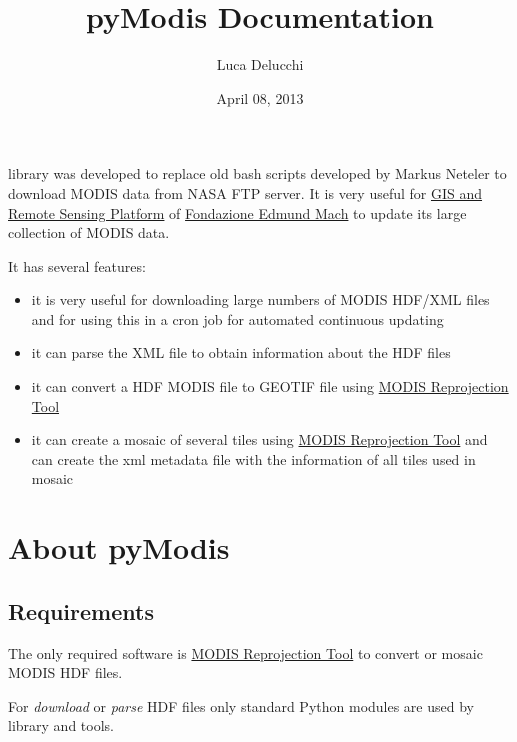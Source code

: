 \documentclass[a4paper,11pt,oneside]{sphinxmanual}
\title{pyModis Documentation}
\date{April 08, 2013}
\author{Luca Delucchi}
\begin{document}
\maketitle
\tableofcontents
{}\label{index::doc}


 library was developed to replace old bash scripts developed by Markus
Neteler to download MODIS data from NASA FTP server. It is very useful for
\href{http://gis.cri.fmach.it}{GIS and Remote Sensing Platform} of \href{http://www.fmach.it}{Fondazione Edmund Mach} to update
its large collection of MODIS data.

It has several features:
\begin{itemize}
\item {} 
it is very useful for downloading large numbers of MODIS HDF/XML files
and for using this in a cron job for automated continuous updating

\item {} 
it can parse the XML file to obtain information about the HDF files

\item {} 
it can convert a HDF MODIS file to GEOTIF file using \href{https://lpdaac.usgs.gov/lpdaac/tools/modis\_reprojection\_tool}{MODIS Reprojection Tool}

\item {} 
it can create a mosaic of several tiles using \href{https://lpdaac.usgs.gov/lpdaac/tools/modis\_reprojection\_tool}{MODIS Reprojection Tool} and can
create the xml metadata file with the information of all tiles used in mosaic

\end{itemize}


\chapter{About pyModis}
\label{info:welcome-to-pymodis}\label{info::doc}\label{info:about-pymodis}

\section{Requirements}
\label{info:requirements}
The only required software is \href{https://lpdaac.usgs.gov/tools/modis\_reprojection\_tool}{MODIS Reprojection Tool}
to convert or mosaic MODIS HDF files.

For \emph{download} or \emph{parse} HDF files only standard Python modules are used
by  library and tools.
\end{document}
